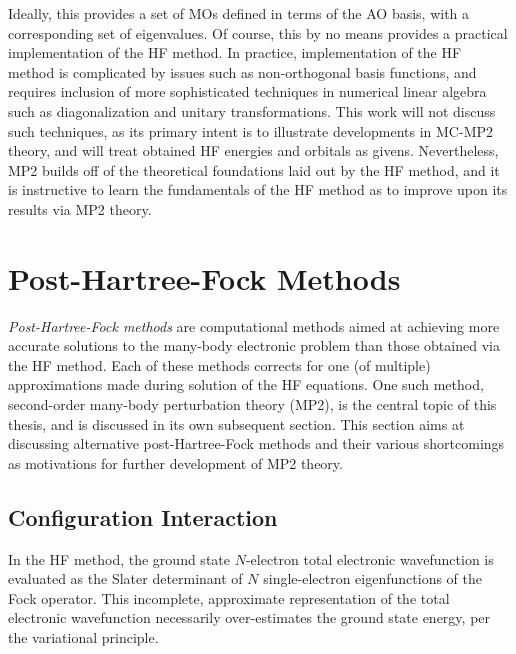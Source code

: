 Ideally, this provides a set of MOs defined in terms of the AO basis, with a
corresponding set of eigenvalues. Of course, this by no means provides a
practical implementation of the HF method. In practice, implementation of the HF
method is complicated by issues such as non-orthogonal basis functions, and
requires inclusion of more sophisticated techniques in numerical linear algebra
such as diagonalization and unitary transformations. This work will not discuss
such techniques, as its primary intent is to illustrate developments in MC-MP2
theory, and will treat obtained HF energies and orbitals as givens.
Nevertheless, MP2 builds off of the theoretical foundations laid out by the HF
method, and it is instructive to learn the fundamentals of the HF method as to
improve upon its results via MP2 theory.

%

\section{Post-Hartree-Fock Methods}
\label{s:post-hf}

\emph{Post-Hartree-Fock methods} are computational methods aimed at achieving
more accurate solutions to the many-body electronic problem than those obtained
via the HF method. Each of these methods corrects for one (of multiple)
approximations made during solution of the HF equations. One such method,
second-order many-body perturbation theory (MP2), is the central topic of this
thesis, and is discussed in its own subsequent section. This section aims at
discussing alternative post-Hartree-Fock methods and their various shortcomings
as motivations for further development of MP2 theory.

\subsection{Configuration Interaction}

In the HF method, the ground state $N$-electron total electronic wavefunction is
evaluated as the Slater determinant of $N$ single-electron eigenfunctions of the
Fock operator. This incomplete, approximate representation of the total
electronic wavefunction necessarily over-estimates the ground state energy, per
the variational principle.

